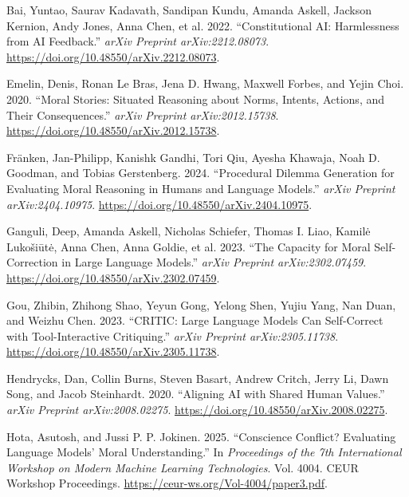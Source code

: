 \documentclass[
]{article}
\newlength{\cslhangindent}
\newenvironment{CSLReferences}[2] %
 {\begin{list}{}{%
  \setlength{\itemindent}{0pt}
  \setlength{\leftmargin}{0pt}
  \setlength{\parsep}{0pt}
  \ifodd #1
   \setlength{\leftmargin}{\cslhangindent}
   \setlength{\itemindent}{-1\cslhangindent}
  \fi
  \setlength{\itemsep}{#2\baselineskip}}}
 {\end{list}}
\begin{document}
\protect{}\label{refs}
\begin{CSLReferences}{1}{0}
Bai, Yuntao, Saurav Kadavath, Sandipan Kundu, Amanda Askell, Jackson
Kernion, Andy Jones, Anna Chen, et al. 2022. {``Constitutional {AI}:
Harmlessness from {AI} Feedback.''} \emph{arXiv Preprint
arXiv:2212.08073}. \url{https://doi.org/10.48550/arXiv.2212.08073}.

Emelin, Denis, Ronan Le Bras, Jena D. Hwang, Maxwell Forbes, and Yejin
Choi. 2020. {``Moral Stories: Situated Reasoning about Norms, Intents,
Actions, and Their Consequences.''} \emph{arXiv Preprint
arXiv:2012.15738}. \url{https://doi.org/10.48550/arXiv.2012.15738}.

Fränken, Jan-Philipp, Kanishk Gandhi, Tori Qiu, Ayesha Khawaja, Noah D.
Goodman, and Tobias Gerstenberg. 2024. {``Procedural Dilemma Generation
for Evaluating Moral Reasoning in Humans and Language Models.''}
\emph{arXiv Preprint arXiv:2404.10975}.
\url{https://doi.org/10.48550/arXiv.2404.10975}.

Ganguli, Deep, Amanda Askell, Nicholas Schiefer, Thomas I. Liao, Kamilė
Lukošiūtė, Anna Chen, Anna Goldie, et al. 2023. {``The Capacity for
Moral Self-Correction in Large Language Models.''} \emph{arXiv Preprint
arXiv:2302.07459}. \url{https://doi.org/10.48550/arXiv.2302.07459}.

Gou, Zhibin, Zhihong Shao, Yeyun Gong, Yelong Shen, Yujiu Yang, Nan
Duan, and Weizhu Chen. 2023. {``{CRITIC}: Large Language Models Can
Self-Correct with Tool-Interactive Critiquing.''} \emph{arXiv Preprint
arXiv:2305.11738}. \url{https://doi.org/10.48550/arXiv.2305.11738}.

Hendrycks, Dan, Collin Burns, Steven Basart, Andrew Critch, Jerry Li,
Dawn Song, and Jacob Steinhardt. 2020. {``Aligning {AI} with Shared
Human Values.''} \emph{arXiv Preprint arXiv:2008.02275}.
\url{https://doi.org/10.48550/arXiv.2008.02275}.

Hota, Asutosh, and Jussi P. P. Jokinen. 2025. {``Conscience Conflict?
Evaluating Language Models' Moral Understanding.''} In \emph{Proceedings
of the 7th International Workshop on Modern Machine Learning
Technologies}. Vol. 4004. CEUR Workshop Proceedings.
\url{https://ceur-ws.org/Vol-4004/paper3.pdf}.


\end{CSLReferences}
\end{document}
